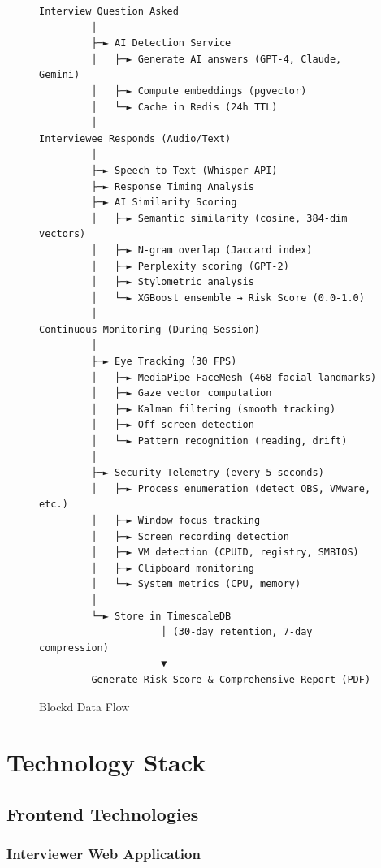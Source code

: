 \documentclass[11pt,letterpaper]{article}
\begin{document}
\begin{figure}[H]
\centering
\begin{verbatim}
Interview Question Asked
         │
         ├─► AI Detection Service
         │   ├─► Generate AI answers (GPT-4, Claude, Gemini)
         │   ├─► Compute embeddings (pgvector)
         │   └─► Cache in Redis (24h TTL)
         │
Interviewee Responds (Audio/Text)
         │
         ├─► Speech-to-Text (Whisper API)
         ├─► Response Timing Analysis
         ├─► AI Similarity Scoring
         │   ├─► Semantic similarity (cosine, 384-dim vectors)
         │   ├─► N-gram overlap (Jaccard index)
         │   ├─► Perplexity scoring (GPT-2)
         │   ├─► Stylometric analysis
         │   └─► XGBoost ensemble → Risk Score (0.0-1.0)
         │
Continuous Monitoring (During Session)
         │
         ├─► Eye Tracking (30 FPS)
         │   ├─► MediaPipe FaceMesh (468 facial landmarks)
         │   ├─► Gaze vector computation
         │   ├─► Kalman filtering (smooth tracking)
         │   ├─► Off-screen detection
         │   └─► Pattern recognition (reading, drift)
         │
         ├─► Security Telemetry (every 5 seconds)
         │   ├─► Process enumeration (detect OBS, VMware, etc.)
         │   ├─► Window focus tracking
         │   ├─► Screen recording detection
         │   ├─► VM detection (CPUID, registry, SMBIOS)
         │   ├─► Clipboard monitoring
         │   └─► System metrics (CPU, memory)
         │
         └─► Store in TimescaleDB
                     │ (30-day retention, 7-day compression)
                     ▼
         Generate Risk Score & Comprehensive Report (PDF)
\end{verbatim}
\caption{Blockd Data Flow}
\end{figure}


\section{Technology Stack}

\subsection{Frontend Technologies}

\subsubsection{Interviewer Web Application}
\end{document}
